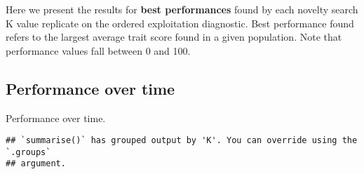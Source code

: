 \documentclass[]{book}
\newenvironment{Shaded}{\begin{snugshade}}{\end{snugshade}}
\newcommand{\DataTypeTok}[1]{\textcolor[rgb]{0.13,0.29,0.53}{#1}}
\newcommand{\KeywordTok}[1]{\textcolor[rgb]{0.13,0.29,0.53}{\textbf{#1}}}
\newcommand{\NormalTok}[1]{#1}
\newcommand{\OperatorTok}[1]{\textcolor[rgb]{0.81,0.36,0.00}{\textbf{#1}}}
\newcommand{\StringTok}[1]{\textcolor[rgb]{0.31,0.60,0.02}{#1}}
\begin{document}
Here we present the results for \textbf{best performances} found by each novelty search K value replicate on the ordered exploitation diagnostic.
Best performance found refers to the largest average trait score found in a given population.
Note that performance values fall between 0 and 100.

\hypertarget{performance-over-time-23}{%
\subsection{Performance over time}\label{performance-over-time-23}}

Performance over time.

\begin{Shaded}
\end{Shaded}

\begin{verbatim}
## `summarise()` has grouped output by 'K'. You can override using the `.groups`
## argument.
\end{verbatim}
\end{document}
